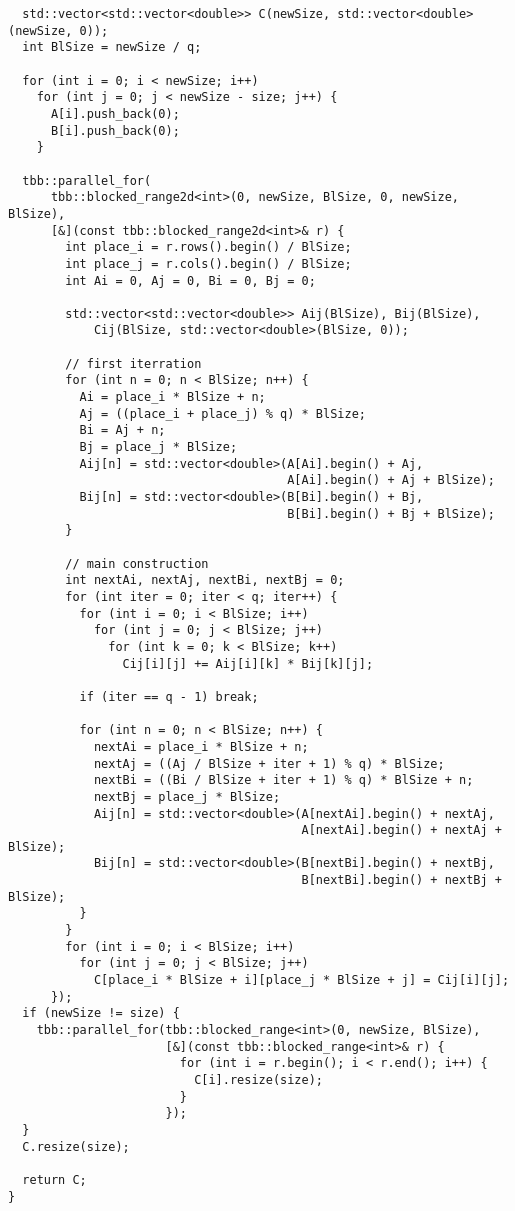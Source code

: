 \documentclass{report}
\begin{document}
\begin{lstlisting}
  std::vector<std::vector<double>> C(newSize, std::vector<double>(newSize, 0));
  int BlSize = newSize / q;

  for (int i = 0; i < newSize; i++)
    for (int j = 0; j < newSize - size; j++) {
      A[i].push_back(0);
      B[i].push_back(0);
    }

  tbb::parallel_for(
      tbb::blocked_range2d<int>(0, newSize, BlSize, 0, newSize, BlSize),
      [&](const tbb::blocked_range2d<int>& r) {
        int place_i = r.rows().begin() / BlSize;
        int place_j = r.cols().begin() / BlSize;
        int Ai = 0, Aj = 0, Bi = 0, Bj = 0;

        std::vector<std::vector<double>> Aij(BlSize), Bij(BlSize),
            Cij(BlSize, std::vector<double>(BlSize, 0));

        // first iterration
        for (int n = 0; n < BlSize; n++) {
          Ai = place_i * BlSize + n;
          Aj = ((place_i + place_j) % q) * BlSize;
          Bi = Aj + n;
          Bj = place_j * BlSize;
          Aij[n] = std::vector<double>(A[Ai].begin() + Aj,
                                       A[Ai].begin() + Aj + BlSize);
          Bij[n] = std::vector<double>(B[Bi].begin() + Bj,
                                       B[Bi].begin() + Bj + BlSize);
        }

        // main construction
        int nextAi, nextAj, nextBi, nextBj = 0;
        for (int iter = 0; iter < q; iter++) {
          for (int i = 0; i < BlSize; i++)
            for (int j = 0; j < BlSize; j++)
              for (int k = 0; k < BlSize; k++)
                Cij[i][j] += Aij[i][k] * Bij[k][j];

          if (iter == q - 1) break;

          for (int n = 0; n < BlSize; n++) {
            nextAi = place_i * BlSize + n;
            nextAj = ((Aj / BlSize + iter + 1) % q) * BlSize;
            nextBi = ((Bi / BlSize + iter + 1) % q) * BlSize + n;
            nextBj = place_j * BlSize;
            Aij[n] = std::vector<double>(A[nextAi].begin() + nextAj,
                                         A[nextAi].begin() + nextAj + BlSize);
            Bij[n] = std::vector<double>(B[nextBi].begin() + nextBj,
                                         B[nextBi].begin() + nextBj + BlSize);
          }
        }
        for (int i = 0; i < BlSize; i++)
          for (int j = 0; j < BlSize; j++)
            C[place_i * BlSize + i][place_j * BlSize + j] = Cij[i][j];
      });
  if (newSize != size) {
    tbb::parallel_for(tbb::blocked_range<int>(0, newSize, BlSize),
                      [&](const tbb::blocked_range<int>& r) {
                        for (int i = r.begin(); i < r.end(); i++) {
                          C[i].resize(size);
                        }
                      });
  }
  C.resize(size);

  return C;
}

\end{lstlisting}
\end{document}
